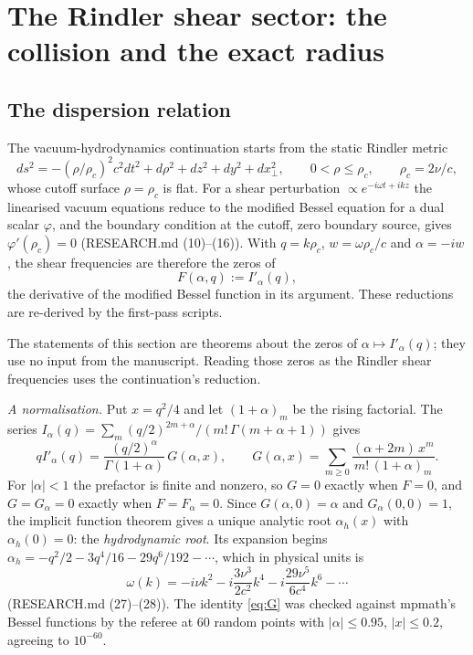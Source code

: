 \section{The Rindler shear sector: the collision and the exact radius}\label{sec:rindler}

\subsection{The dispersion relation}

The vacuum-hydrodynamics continuation starts from the static Rindler metric
\[
ds^2=-(\rho/\rho_c)^2c^2dt^2+d\rho^2+dz^2+dy^2+dx_\perp^2,\qquad 0<\rho\le\rho_c,\qquad \rho_c=2\nu/c,
\]
whose cutoff surface $\rho=\rho_c$ is flat. For a shear perturbation $\propto e^{-i\omega t+ikz}$ the linearised vacuum equations reduce to the modified Bessel equation for a dual scalar $\varphi$, and the boundary condition at the cutoff, zero boundary source, gives $\varphi'(\rho_c)=0$ (RESEARCH.md (10)--(16)). With $q=k\rho_c$, $w=\omega\rho_c/c$ and $\alpha=-iw$, the shear frequencies are therefore the zeros of
\begin{equation}\label{eq:disp}
F(\alpha,q):=I'_\alpha(q),
\end{equation}
the derivative of the modified Bessel function in its argument. These reductions are re-derived by the first-pass scripts.

The statements of this section are theorems about the zeros of $\alpha\mapsto I'_\alpha(q)$; they use no input from the manuscript. Reading those zeros as the Rindler shear frequencies uses the continuation's reduction.

\emph{A normalisation.} Put $x=q^2/4$ and let $(1+\alpha)_m$ be the rising factorial. The series $I_\alpha(q)=\sum_m(q/2)^{2m+\alpha}/(m!\,\Gamma(m+\alpha+1))$ gives
\begin{equation}\label{eq:G}
qI'_\alpha(q)=\frac{(q/2)^\alpha}{\Gamma(1+\alpha)}\,G(\alpha,x),\qquad G(\alpha,x)=\sum_{m\ge0}\frac{(\alpha+2m)\,x^m}{m!\,(1+\alpha)_m}.
\end{equation}
For $|\alpha|<1$ the prefactor is finite and nonzero, so $G=0$ exactly when $F=0$, and $G=G_\alpha=0$ exactly when $F=F_\alpha=0$. Since $G(\alpha,0)=\alpha$ and $G_\alpha(0,0)=1$, the implicit function theorem gives a unique analytic root $\alpha_h(x)$ with $\alpha_h(0)=0$: the \emph{hydrodynamic root}. Its expansion begins $\alpha_h=-q^2/2-3q^4/16-29q^6/192-\cdots$, which in physical units is
\[
\omega(k)=-i\nu k^2-i\frac{3\nu^3}{2c^2}k^4-i\frac{29\nu^5}{6c^4}k^6-\cdots
\]
(RESEARCH.md (27)--(28)). The identity \eqref{eq:G} was checked against mpmath's Bessel functions by the referee at $60$ random points with $|\alpha|\le0.95$, $|x|\le0.2$, agreeing to $10^{-60}$.

